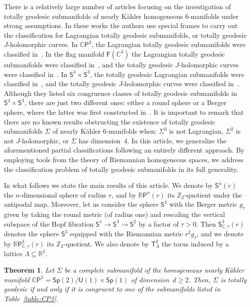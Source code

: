 \documentclass[11pt,a4paper,final]{amsart}
\newcommand{\s}{\mathsf}
\newcommand{\R}{\mathbb{R}}
\newcommand{\C}{\mathbb{C}}
\newtheorem{thmx}{Theorem}
\theoremstyle{definition}
\begin{document}
There is a relatively large number of articles focusing on the  investigation of totally geodesic submanifolds of nearly Kähler homogeneous $6$-manifolds under strong assumptions.
In these works the authors use special frames to carry out the classification for Lagrangian totally geodesic submanifolds, or  totally geodesic $J$-holomorphic curves.
In  $\C\s{P}^3$, the Lagrangian totally geodesic submanifolds  were classified in~\cite{Aslan,liefsoens}.
In the flag manifold $\s{F}(\C^3)$ the Lagrangian totally geodesic submanifolds were classified in~\cite{Storm}, and the totally geodesic $J$-holomorphic  curves were classified in~\cite{CwiklinskiVrancken}.
In $\s{S}^3\times\s{S}^3$, the totally geodesic Lagrangian submanifolds were classified in~\cite{dioos}, and the totally geodesic $J$-holomorphic curves were classified in~\cite{BoltonDillenDioosVrancken}.
Although they listed six congruence classes of totally geodesic submanifolds in $\s{S}^3\times\s{S}^3$, there are just two different ones: either a round sphere or a  Berger sphere, where the latter was first constructed in~\cite{moroianu}.
It is important to remark that there are no known  results obstructing the existence of totally geodesic submanifolds $\Sigma$ of nearly Kähler $6$-manifolds when: $\Sigma^3$ is not Lagrangian, $\Sigma^2$ is not $J$-holomorphic, or $\Sigma$ has dimension~$4$.
In this article, we generalize the aforementioned partial classifications  following an entirely different approach.
By employing tools from the theory of Riemannian homogeneous spaces, we address the classification problem of totally geodesic submanifolds in its full generality.

In what follows we state the main results of this article. We denote by $\s{S}^n(r)$ the $n$-dimensional sphere of radius $r$, and by $\R\s{P}^n(r)$  its $\mathbb{Z}_2$-quotient under the antipodal map. Moreover, let us consider the sphere $\s{S}^{3}$ with the Berger metric $g_\tau$ given by taking the round metric (of radius one) and rescaling the vertical subspace of the Hopf fibration $\s{S}^1\rightarrow \s{S}^3\rightarrow \s{S}^2$ by a factor of $\tau>0$.  Then $\s{S}^{3}_{\C,\tau}(r)$ denotes the sphere $\s{S}^{3}$ equipped with the Riemannian metric $r^{2} g_\tau$, and we denote by $\R\s{P}^{3}_{\C,\tau}(r)$ its $\mathbb{Z}_2$-quotient.  We also denote by $\s{T}^2_{\Lambda}$ the torus induced by a lattice $\Lambda\subseteq \R^2$.

\begin{thmx}\label{th:tg-cp3-classification}
	Let $\Sigma$ be a complete submanifold of the homogeneous nearly Kähler manifold $\C\s{P}^3=\s{Sp}(2)/\s{U}(1)\times\s{Sp}(1)$ of dimension~$d\ge 2$. Then, $\Sigma$ is totally geodesic if and only if it is congruent to one of the submanifolds listed in Table~\ref{table:CP3}.
\end{thmx}
\end{document}
